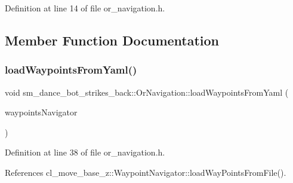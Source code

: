 Definition at line 14 of file or\+\_\+navigation.\+h.



\subsection{Member Function Documentation}
\mbox{\label{classsm__dance__bot__strikes__back_1_1OrNavigation_abd8811831075be61ad28fe4a68fc738d}} 
\subsubsection{\texorpdfstring{load\+Waypoints\+From\+Yaml()}{loadWaypointsFromYaml()}}
{\footnotesize\ttfamily void sm\+\_\+dance\+\_\+bot\+\_\+strikes\+\_\+back\+::\+Or\+Navigation\+::load\+Waypoints\+From\+Yaml (\begin{DoxyParamCaption}\item[{\hyperlink{classcl__move__base__z_1_1WaypointNavigator}{Waypoint\+Navigator} $\ast$}]{waypoints\+Navigator }\end{DoxyParamCaption})\hspace{0.3cm}{\ttfamily [inline]}}



Definition at line 38 of file or\+\_\+navigation.\+h.



References cl\+\_\+move\+\_\+base\+\_\+z\+::\+Waypoint\+Navigator\+::load\+Way\+Points\+From\+File().


